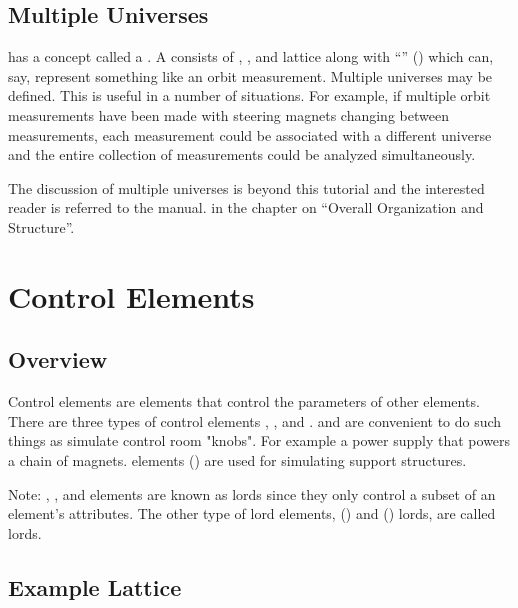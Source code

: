 \documentclass{hitec}
\newcommand{\Section}[1]{\section{#1}\vspace*{-1ex}}
\begin{document}
\subsection{Multiple Universes}
\label{s:mult.uni}

\tao has a concept called a . A  consists of , ,
and  lattice along with ``'' () which can, say, represent something like
an orbit measurement. Multiple universes may be defined. This is useful in a number of 
situations. For example, if multiple orbit measurements have been made with steering magnets
changing between measurements, each measurement could be associated with a different universe
and the entire collection of measurements could be analyzed simultaneously. 

The discussion of multiple universes is beyond this tutorial and the interested reader is 
referred to the \tao manual. in the chapter on ``Overall Organization and Structure''.


\newpage

\Section{Control Elements}

\subsection{Overview}

Control elements are elements that control the parameters of other elements. There are three types
of control elements , , and .  and
 are convenient to do such things as simulate control room "knobs". For example a power
supply that powers a chain of magnets.  elements ()
are used for simulating support structures.

Note: , , and  elements are known as  lords since they
only control a subset of an element's attributes. The other type of lord elements, 
() and  () lords, are called  lords.

\subsection{Example Lattice}
\end{document}

